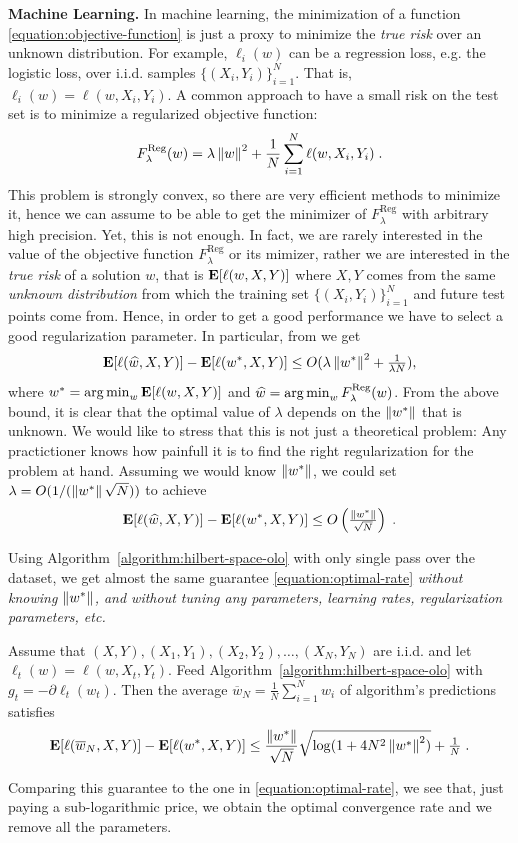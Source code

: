 \textbf{Machine Learning.} In machine learning, the minimization of a function
\eqref{equation:objective-function} is just a proxy to minimize the \emph{true
risk} over an unknown distribution. For example, $\ell_i(w)$ can be a
regression loss, e.g. the logistic loss, over i.i.d. samples $\{(X_i,
Y_i)\}_{i=1}^N$. That is, $\ell_i(w)=\ell(w,X_i,Y_i)$. A common approach to
have a small risk on the test set is to minimize a regularized objective
function:
%
\begin{equation}
\label{eq:reg_logloss}
F_\lambda^{\text{Reg}}(w) = \lambda \left\|{w}\right\|^2 + \frac{1}{N} \sum_{i=1}^N \ell(w, X_i, Y_i) \; .
\end{equation}
%
This problem is strongly convex, so there are very efficient methods to
minimize it, hence we can assume to be able to get the minimizer of
$F_\lambda^{\text{Reg}}$ with arbitrary high precision. Yet, this is not
enough. In fact, we are rarely interested in the value of the objective
function $F_\lambda^{\text{Reg}}$ or its mimizer, rather we are interested in
the \emph{true risk} of a solution $w$, that is $\operatorname*{\mathbf{E}}[\ell(w,X,Y)]$ where $X,Y$
comes from the same \emph{unknown distribution} from which the training set
$\{(X_i,Y_i)\}_{i=1}^N$ and future test points come from. Hence, in order to
get a good performance we have to select a good regularization parameter. In
particular, from \cite{Sridharan-Shalev-Shwartz-Srebro-2009} we get
\[
\operatorname*{\mathbf{E}}[\ell(\widehat{w},X,Y)] - \operatorname*{\mathbf{E}}[\ell(w^*,X,Y)] \le O(\lambda \left\|{w^*}\right\|^2 + \tfrac{1}{\lambda N}),
\]
where $w^*=\operatorname*{arg\,min}_w \operatorname*{\mathbf{E}}[\ell(w,X,Y)]$ and $\widehat{w} = \operatorname*{arg\,min}_w
F_\lambda^{\text{Reg}}(w)$.  From the above bound, it is clear that the optimal value
of $\lambda$ depends on the $\left\|{w^*}\right\|$ that is unknown. We would like to
stress that this is not just a theoretical problem: Any practictioner knows how
painfull it is to find the right regularization for the problem at hand.
Assuming we would know $\left\|{w^*}\right\|$, we could set $\lambda = O(1/(\left\|{w^*}\right\|
\sqrt{N}))$ to achieve
%
\begin{equation}
\label{equation:optimal-rate}
\operatorname*{\mathbf{E}}[\ell(\widehat{w},X,Y)] - \operatorname*{\mathbf{E}}[\ell(w^*,X,Y)] \le O\left(\tfrac{\left\|{w^*}\right\|}{\sqrt{N}}\right) \; .
\end{equation}

Using Algorithm~\ref{algorithm:hilbert-space-olo} with only single pass over
the dataset, we get almost the same guarantee \eqref{equation:optimal-rate}
\emph{without knowing $\left\|{w^*}\right\|$, and without tuning any parameters, learning
rates, regularization parameters, etc.}
%
\begin{theorem}
Assume that $(X, Y), (X_1, Y_1), (X_2, Y_2), \dots, (X_N,Y_N)$ are i.i.d.  and
let $\ell_t(w) = \ell(w,X_t,Y_t)$. Feed
Algorithm~\ref{algorithm:hilbert-space-olo} with $g_t = - \partial
\ell_t(w_t)$. Then the average $\overline{w}_N = \frac{1}{N} \sum_{i=1}^N w_i$
of algorithm's predictions satisfies
$$
\operatorname*{\mathbf{E}}[\ell(\overline{w}_N,X,Y)] - \operatorname*{\mathbf{E}}[\ell(w^*,X,Y)] \le \frac{\left\|{w^*}\right\|}{\sqrt{N}} \sqrt{\log(1+4 N^2 \left\|{w^*}\right\|^2)} + \tfrac{1}{N} \; .
$$
\end{theorem}
%
Comparing this guarantee to the one in \eqref{equation:optimal-rate}, we see
that, just paying a sub-logarithmic price, we obtain the optimal convergence
rate and we remove all the parameters.

